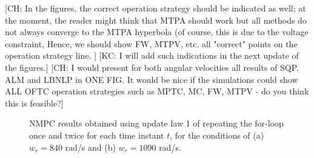 \documentclass[journal]{IEEEtranTIE}
\newcommand{\CHHA}[1]{{\color{red} [CH: #1]}} %
\newcommand{\KYCH}[1]{{\color{blue} [KC: #1]}} %
\begin{document}
\CHHA{In the figures, the correct operation strategy should be indicated as well; at the moment, the reader might think that MTPA should work but all methods do not always converge to the MTPA hyperbola (of course, this is due to the voltage constraint, Hence, we should show FW, MTPV, etc. all "correct" points on the operation strategy line. }\KYCH{I will add such indications in the next update of the figures.} \CHHA{I would present for both angular velocities all results of SQP, ALM and LBNLP in ONE FIG. It would be nice if the simulations could show ALL OFTC operation strategies such as MPTC, MC, FW, MTPV - do you think this is feasible?}


\begin{figure}[!t]
\centering
{}
\vfill
{}
\caption{NMPC results obtained using update law 1 of repeating the for-loop once and twice for each time instant $t$, for the conditions of (a) $w_r = 840$ rad/s  and (b) $w_r = 1090$ rad/s.
}\label{Fig_UL1}
\end{figure}
\end{document}
